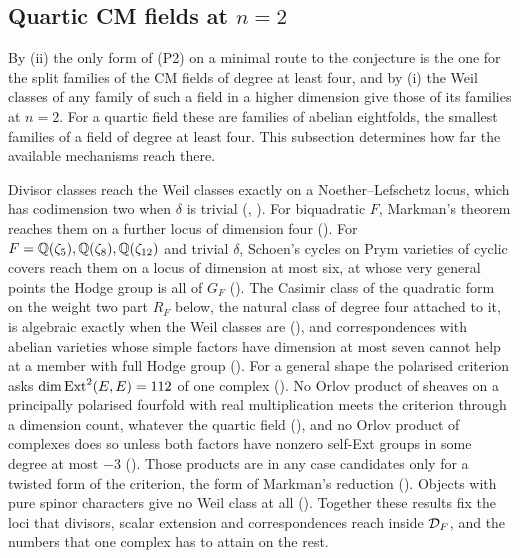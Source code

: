 \subsection{Quartic CM fields at \texorpdfstring{$n=2$}{n=2}}
\label{ssec:quartic}

By (ii) the only form of (P2) on a minimal route to the
conjecture is the one for the split families of the CM fields of degree at
least four, and by (i) the Weil classes of any family of
such a field in a higher dimension give those of its families at $n=2$. For a
quartic field these are families of abelian eightfolds, the smallest
families of a field of degree at least four. This subsection determines how
far the available mechanisms reach there.

Divisor classes reach the Weil classes exactly on a Noether--Lefschetz locus,
which has codimension two when $\delta$ is trivial (,
). For biquadratic $F$, Markman's theorem reaches them
on a further locus of dimension four (). For
$F=\mathbb{Q}(\zeta_{5}),\mathbb{Q}(\zeta_{8}),\mathbb{Q}(\zeta_{12})$ and trivial $\delta$,
Schoen's cycles on Prym varieties of cyclic covers reach them on a locus of
dimension at most six, at whose very general points the Hodge group is all of
$G_{F}$ (). The Casimir class of the quadratic form on
the weight two part $R_{F}$ below, the natural class of degree four attached
to it, is algebraic exactly when the Weil classes are
(), and correspondences with abelian varieties whose
simple factors have dimension at most seven cannot help at a member with full
Hodge group (). For a general shape the polarised
criterion asks $\dim\operatorname{Ext}^{2}(E,E)=112$ of one complex
(). No Orlov product of sheaves on a principally
polarised fourfold with real multiplication meets the criterion through a
dimension count, whatever the quartic field (),
and no Orlov product of complexes does so unless both factors have nonzero self-Ext
groups in some degree at most $-3$ (). Those products
are in any case candidates only for a twisted form of the criterion, the form
of Markman's reduction (). Objects with pure
spinor characters give no Weil class at all ().
Together these results fix the loci that
divisors, scalar extension and correspondences reach inside $\mathcal{D}_{F}$, and
the numbers that one complex has to attain on the rest.

